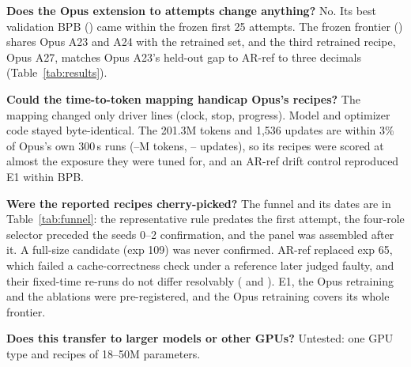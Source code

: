 \documentclass{article}
\begin{document}
\textbf{Does the Opus extension to \CROpAttempts{} attempts change anything?} No. Its best validation BPB (\CROpBestFrozen) came within the frozen first 25 attempts. The frozen frontier (\CROpFrontierFrozen) shares Opus A23 and A24 with the retrained set, and the third retrained recipe, Opus A27, matches Opus A23's held-out gap to AR-ref to three decimals (Table~\ref{tab:results}).

\textbf{Could the time-to-token mapping handicap Opus's recipes?} The mapping changed only driver lines (clock, stop, progress). Model and optimizer code stayed byte-identical. The 201.3M tokens and 1{,}536 updates are within 3\% of Opus's own 300\,s runs (\CROpTokLo--\CROpTokHi M tokens, \CROpUpdLo--\CROpUpdHi{} updates), so its recipes were scored at almost the exposure they were tuned for, and an AR-ref drift control reproduced E1 within \CRMTDriftAbs{} BPB.

\textbf{Were the reported recipes cherry-picked?} The funnel and its dates are in Table~\ref{tab:funnel}: the representative rule predates the first attempt, the four-role selector preceded the seeds 0--2 confirmation, and the panel was assembled after it. A full-size candidate (exp 109) was never confirmed. AR-ref replaced exp 65, which failed a cache-correctness check under a reference later judged faulty, and their fixed-time re-runs do not differ resolvably (\CRFixedSixtyFive{} and \CRFixedSixtyEight). E1, the Opus retraining and the ablations were pre-registered, and the Opus retraining covers its whole frontier.

\textbf{Does this transfer to larger models or other GPUs?} Untested: one GPU type and recipes of 18--50M parameters.
\end{document}
